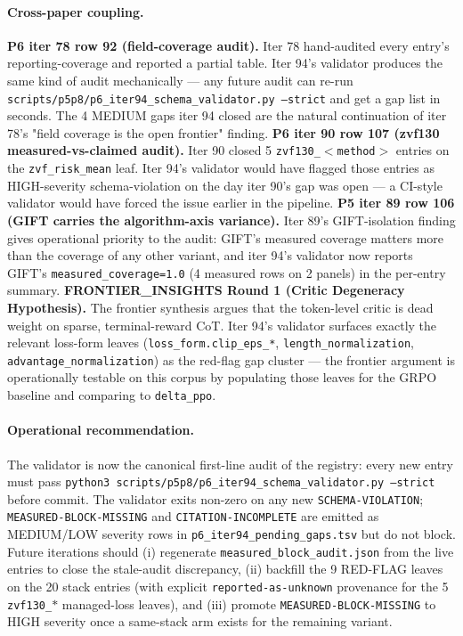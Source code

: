 \paragraph{Cross-paper coupling.}
\textbf{P6 iter 78 row 92 (field-coverage audit).} Iter 78 hand-audited every
entry's reporting-coverage and reported a partial table. Iter 94's validator
produces the same kind of audit mechanically --- any future audit can re-run
\texttt{scripts/p5p8/p6\_iter94\_schema\_validator.py --strict} and get a
gap list in seconds. The 4 MEDIUM gaps iter 94 closed are the natural
continuation of iter 78's "field coverage is the open frontier" finding.
\textbf{P6 iter 90 row 107 (zvf130 measured-vs-claimed audit).} Iter 90 closed
5 \texttt{zvf130\_$<$method$>$} entries on the \texttt{zvf\_risk\_mean} leaf.
Iter 94's validator would have flagged those entries as HIGH-severity
schema-violation on the day iter 90's gap was open --- a CI-style validator
would have forced the issue earlier in the pipeline. \textbf{P5 iter 89 row 106
(GIFT carries the algorithm-axis variance).} Iter 89's GIFT-isolation finding
gives operational priority to the audit: GIFT's measured coverage matters more
than the coverage of any other variant, and iter 94's validator now reports
GIFT's \texttt{measured\_coverage=1.0} (4 measured rows on 2 panels) in the
per-entry summary. \textbf{FRONTIER\_INSIGHTS Round 1 (Critic Degeneracy
Hypothesis).} The frontier synthesis argues that the token-level critic is
dead weight on sparse, terminal-reward CoT. Iter 94's validator surfaces
exactly the relevant loss-form leaves (\texttt{loss\_form.clip\_eps\_*},
\texttt{length\_normalization}, \texttt{advantage\_normalization}) as the
red-flag gap cluster --- the frontier argument is operationally testable on
this corpus by populating those leaves for the GRPO baseline and comparing
to \texttt{delta\_ppo}.

\paragraph{Operational recommendation.}
The validator is now the canonical first-line audit of the registry: every
new entry must pass \texttt{python3 scripts/p5p8/p6\_iter94\_schema\_validator.py
--strict} before commit. The validator exits non-zero on any new
\texttt{SCHEMA-VIOLATION}; \texttt{MEASURED-BLOCK-MISSING} and
\texttt{CITATION-INCOMPLETE} are emitted as MEDIUM/LOW severity rows in
\texttt{p6\_iter94\_pending\_gaps.tsv} but do not block. Future iterations
should (i) regenerate \texttt{measured\_block\_audit.json} from the live
entries to close the stale-audit discrepancy, (ii) backfill the 9 RED-FLAG
leaves on the 20 stack entries (with explicit
\texttt{reported-as-unknown} provenance for the 5 \texttt{zvf130\_$*$}
managed-loss leaves), and (iii) promote \texttt{MEASURED-BLOCK-MISSING} to
HIGH severity once a same-stack arm exists for the remaining variant.

